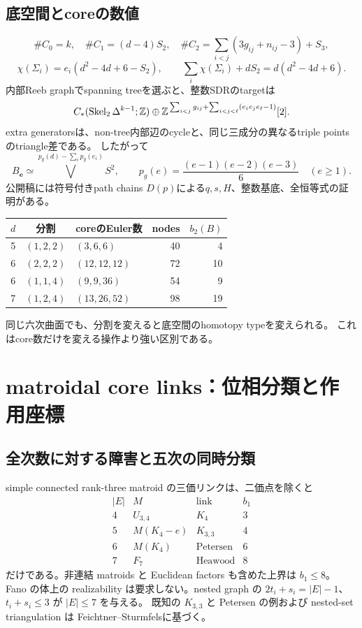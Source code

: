 \documentclass[11pt,a4paper]{article}
\begin{document}
\subsection{底空間とcoreの数値}

\[
 \#C_0=k,\quad \#C_1=(d-4)S_2,\quad
 \#C_2=\sum_{i<j}(3g_{ij}+n_{ij}-3)+S_3,
\]
\[
 \chi(\Sigma_i)=e_i(d^2-4d+6-S_2),\qquad
 \sum_i\chi(\Sigma_i)+dS_2=d(d^2-4d+6).
\]
内部Reeb graphでspanning treeを選ぶと、整数SDRのtargetは
\[
 C_*(\operatorname{Skel}_2\Delta^{k-1};\mathbb Z)
 \oplus\mathbb Z^{\,\sum_{i<j}g_{ij}+\sum_{i<j<\ell}(e_ie_je_\ell-1)}[2].
\]
extra generatorsは、non-tree内部辺のcycleと、同じ三成分の異なるtriple pointsのtriangle差である。
したがって
\[
 B_{\boldsymbol e}\simeq
 \bigvee^{p_g(d)-\sum_i p_g(e_i)}S^2,\qquad
 p_g(e)=\frac{(e-1)(e-2)(e-3)}6\quad(e\ge1).
\]
公開稿には符号付きpath chains $D(p)$による$q,s,H$、整数基底、全恒等式の証明がある。

\begin{center}
\begin{tabular}{@{}cclrr@{}}
\toprule
$d$ & 分割 & coreのEuler数 & nodes & $b_2(B)$\\
\midrule
5 & $(1,2,2)$ & $(3,6,6)$ & 40 & 4\\
6 & $(2,2,2)$ & $(12,12,12)$ & 72 & 10\\
6 & $(1,1,4)$ & $(9,9,36)$ & 54 & 9\\
7 & $(1,2,4)$ & $(13,26,52)$ & 98 & 19\\
\bottomrule
\end{tabular}
\end{center}
同じ六次曲面でも、分割を変えると底空間のhomotopy typeを変えられる。
これはcore数だけを変える操作より強い区別である。

\section{matroidal core links：位相分類と作用座標}

\subsection{全次数に対する障害と五次の同時分類}

simple connected rank-three matroid の三価リンクは、二価点を除くと
\[
\begin{array}{c|c|c|c}
|E|&M&\text{link}&b_1\\\hline
4&U_{3,4}&K_4&3\\
5&M(K_4-e)&K_{3,3}&4\\
6&M(K_4)&\text{Petersen}&6\\
7&F_7&\text{Heawood}&8
\end{array}
\]
だけである。非連結 matroids と Euclidean factors も含めた上界は $b_1\le8$。
Fano の体上の realizability は要求しない。nested graph の
$2t_i+s_i=|E|-1$、$t_i+s_i\le3$ が $|E|\le7$ を与える。
既知の $K_{3,3}$ と Petersen の例および nested-set triangulation は
Feichtner--Sturmfels\cite{FeichtnerSturmfels}に基づく。
\end{document}
